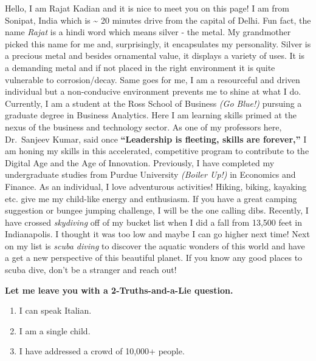 \documentclass[
]{book}
\providecommand{\tightlist}{%
  \setlength{\itemsep}{0pt}\setlength{\parskip}{0pt}}
\begin{document}
Hello, I am Rajat Kadian and it is nice to meet you on this page! I am from Sonipat, India which is \textasciitilde{} 20 minutes drive from the capital of Delhi. Fun fact, the name \emph{Rajat} is a hindi word which means silver - the metal. My grandmother picked this name for me and, surprisingly, it encapsulates my personality. Silver is a precious metal and besides ornamental value, it displays a variety of uses. It is a demanding metal and if not placed in the right environment it is quite vulnerable to corrosion/decay. Same goes for me, I am a resourceful and driven individual but a non-conducive environment prevents me to shine at what I do. Currently, I am a student at the Ross School of Business \emph{(Go Blue!)} pursuing a graduate degree in Business Analytics. Here I am learning skills primed at the nexus of the business and technology sector. As one of my professors here, Dr.~Sanjeev Kumar, said once \textbf{``Leadership is fleeting, skills are forever,''} I am honing my skills in this accelerated, competitive program to contribute to the Digital Age and the Age of Innovation. Previously, I have completed my undergraduate studies from Purdue University \emph{(Boiler Up!)} in Economics and Finance. As an individual, I love adventurous activities! Hiking, biking, kayaking etc. give me my child-like energy and enthusiasm. If you have a great camping suggestion or bungee jumping challenge, I will be the one calling dibs. Recently, I have crossed \emph{skydiving} off of my bucket list when I did a fall from 13,500 feet in Indianapolis. I thought it was too low and maybe I can go higher next time! Next on my list is \emph{scuba diving} to discover the aquatic wonders of this world and have a get a new perspective of this beautiful planet. If you know any good places to scuba dive, don't be a stranger and reach out!

\textbf{Let me leave you with a 2-Truths-and-a-Lie question.}

\begin{enumerate}
\def\labelenumi{\arabic{enumi}.}
\tightlist
\item
  I can speak Italian.
\item
  I am a single child.
\item
  I have addressed a crowd of 10,000+ people.
\end{enumerate}
\end{document}
